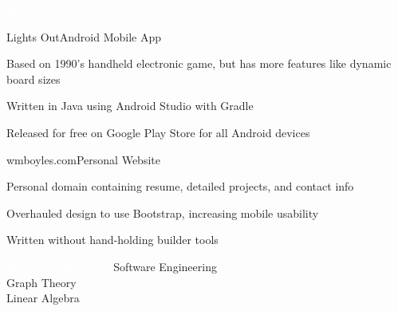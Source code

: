 \documentclass{resume} %
\begin{document}
\begin{rSection}{\colorbox{NCSURED}{\textcolor{WHITE}{Projects}}}
	\begin{rSubsection}{Lights Out}{Android Mobile App}{}{}
		\item Based on 1990's handheld electronic game, but has more features like dynamic board sizes
		\item Written in Java using Android Studio with Gradle
		\item Released for free on Google Play Store for all Android devices
	\end{rSubsection}
	
	\begin{rSubsection}{wmboyles.com}{Personal Website}{}{}
		\item Personal domain containing resume, detailed projects, and contact info
		\item Overhauled design to use Bootstrap, increasing mobile usability
		\item Written without hand-holding builder tools
	\end{rSubsection}	
\end{rSection}

\begin{rSection}{\colorbox{NCSURED}{\textcolor{WHITE}{Relevant Coursework}}}
	{Software Engineering}
	 \\
	{Graph Theory}
	 \\
	{ Linear Algebra}
\end{rSection}
\end{document}
